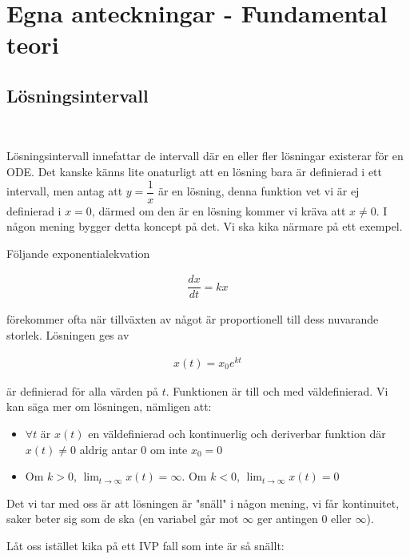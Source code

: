 \section{Egna anteckningar - Fundamental teori}
\par\bigskip

\subsection{Lösningsintervall}\hfill\\
\par
\noindent Lösningsintervall innefattar de intervall där en eller fler lösningar existerar för en ODE. Det kanske känns lite onaturligt att en lösning bara är definierad i ett intervall, men antag att $y = \dfrac{1}{x}$ är en lösning, denna funktion vet vi är ej definierad i $x=0$, därmed om den är en lösning kommer vi kräva att $x\neq 0$. I någon mening bygger detta koncept på det. Vi ska kika närmare på ett exempel.
\par\bigskip
\noindent Följande exponentialekvation

\begin{equation*}
  \begin{gathered}
    \dfrac{dx}{dt}=kx
  \end{gathered}
\end{equation*}\par
\noindent förekommer ofta när tillväxten av något är proportionell till dess nuvarande storlek. Lösningen ges av

\begin{equation*}
  \begin{gathered}
    x(t) = x_0e^{kt}
  \end{gathered}
\end{equation*}\par
\noindent är definierad för alla värden på $t$. Funktionen är till och med väldefinierad. Vi kan säga mer om lösningen, nämligen att:
\par\bigskip
\begin{itemize}
  \item $\forall t$ är $x(t)$ en väldefinierad och kontinuerlig och deriverbar funktion där $x(t)\neq0$ aldrig antar 0 om inte $x_0 = 0$
  \item Om $k>0$, $\lim_{t\to\infty}x(t) = \infty$. Om $k<0$, $\lim_{t\to\infty}x(t)=0$ 
\end{itemize}\par\bigskip
\noindent Det vi tar med oss är att lösningen är "snäll" i någon mening, vi får kontinuitet, saker beter sig som de ska (en variabel går mot $\infty$ ger antingen $0$ eller $\infty$).\par
\noindent Låt oss istället kika på ett IVP fall som inte är så snällt:

